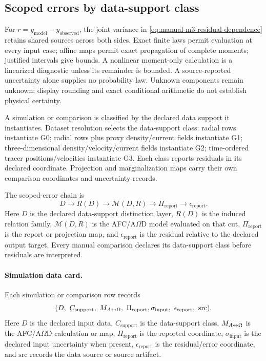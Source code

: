 \subsection{Scoped errors by data-support class}\label{manual:scoped-errors-data-support}

For \(r=y_{\mathrm{model}}-y_{\mathrm{observed}}\), the joint variance in
\eqref{eq:manual-m3-residual-dependence} retains shared sources across both sides. Exact
finite laws permit evaluation at every input case; affine maps permit exact
propagation of complete moments; justified intervals give bounds. A nonlinear
moment-only calculation is a linearized diagnostic unless its remainder is
bounded. A source-reported uncertainty alone supplies no probability law.
Unknown components remain unknown; display rounding and exact conditional
arithmetic do not establish physical certainty.


A simulation or comparison is classified by the declared data support it instantiates. Dataset resolution selects the data-support class: radial rows instantiate G0; radial rows plus proxy density/current fields instantiate G1; three-dimensional density/velocity/current fields instantiate G2; time-ordered tracer positions/velocities instantiate G3. Each class reports residuals in its declared coordinate. Projection and marginalization maps carry their own comparison coordinates and uncertainty records.

The scoped-error chain is
\[
D\rightarrow R(D)\rightarrow \mathcal M(D,R)
\rightarrow \Pi_{\mathrm{report}}
\rightarrow \epsilon_{\mathrm{report}}.
\]
Here \(D\) is the declared data-support distinction layer, \(R(D)\) is the induced relation family, \(\mathcal M(D,R)\) is the AFC/A\(\Omega\)D model evaluated on that cut, \(\Pi_{\mathrm{report}}\) is the report or projection map, and \(\epsilon_{\mathrm{report}}\) is the residual relative to the declared output target. Every manual comparison declares its data-support class before residuals are interpreted.

\paragraph{Simulation data card.}
Each simulation or comparison row records
\[
(D,\ C_{\mathrm{support}},\ M_{\AO},\ \Pi_{\mathrm{report}},\sigma_{\mathrm{input}},\ \epsilon_{\mathrm{report}},\ \mathrm{src}).
\]
Here \(D\) is the declared input data, \(C_{\mathrm{support}}\) is the data-support class, \(M_{A{\leftrightarrow}\Omega}\) is the AFC/A\(\Omega\)D calculation or map, \(\Pi_{\mathrm{report}}\) is the reported coordinate, \(\sigma_{\mathrm{input}}\) is the declared input uncertainty when present, \(\epsilon_{\mathrm{report}}\) is the residual/error coordinate, and \(\mathrm{src}\) records the data source or source artifact.



